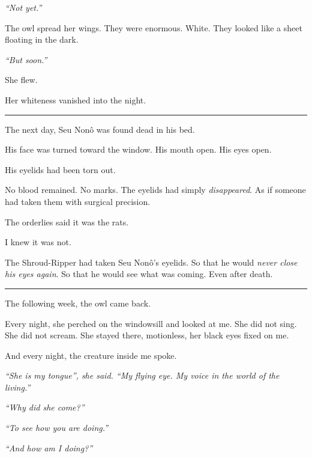 \noindent \textit{\textquotedblleft{}Not yet.\textquotedblright{}}

\noindent The owl spread her wings. They were enormous. White. They looked like a sheet floating in the dark.

\noindent \textit{\textquotedblleft{}But soon.\textquotedblright{}}

\noindent She flew.

\noindent Her whiteness vanished into the night.

\vspace{0.5em}\noindent\rule{\textwidth}{0.5pt}\vspace{0.5em}

\noindent The next day, Seu Nonô was found dead in his bed.

\noindent His face was turned toward the window.
His mouth open.
His eyes open.

\noindent His eyelids had been torn out.

\noindent No blood remained. No marks. The eyelids had simply \textit{disappeared}. As if someone had taken them with surgical precision.

\noindent The orderlies said it was the rats.

\noindent I knew it was not.

\noindent The Shroud-Ripper had taken Seu Nonô's eyelids.
So that he would \textit{never close his eyes again}.
So that he would see what was coming.
Even after death.

\vspace{0.5em}\noindent\rule{\textwidth}{0.5pt}\vspace{0.5em}

\noindent The following week, the owl came back.

\noindent Every night, she perched on the windowsill and looked at me. She did not sing. She did not scream. She stayed there, motionless, her black eyes fixed on me.

\noindent And every night, the creature inside me spoke.

\noindent \textit{\textquotedblleft{}She is my tongue\textquotedblright{}\textit{, she said. }\textquotedblleft{}My flying eye. My voice in the world of the living.\textquotedblright{}}

\noindent \textit{\textquotedblleft{}Why did she come?\textquotedblright{}}

\noindent \textit{\textquotedblleft{}To see how you are doing.\textquotedblright{}}

\noindent \textit{\textquotedblleft{}And how am I doing?\textquotedblright{}}

